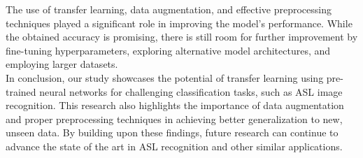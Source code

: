 \documentclass[12pt]{article}
\begin{document}
The use of transfer learning, data augmentation, and effective preprocessing techniques played a significant role in improving the model's performance. While the obtained accuracy is promising, there is still room for further improvement by fine-tuning hyperparameters, exploring alternative model architectures, and employing larger datasets.\\

In conclusion, our study showcases the potential of transfer learning using pre-trained neural networks for challenging classification tasks, such as ASL image recognition. This research also highlights the importance of data augmentation and proper preprocessing techniques in achieving better generalization to new, unseen data. By building upon these findings, future research can continue to advance the state of the art in ASL recognition and other similar applications.\\


\end{document}
